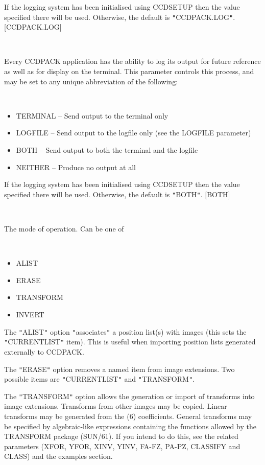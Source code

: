 \documentclass[twoside,11pt]{article}
\newcommand{\htmlref}[2]{#1}
\renewcommand{\_}{\texttt{\symbol{95}}}
\newcommand{\qt}[1]{{\tt "}#1{\tt "}}
\newcommand{\xroutine}[1]{\htmlref{{\sc #1}}{#1}}
\newcommand{\sstsubsection}[1]{ \item[{#1}] \mbox{} \\}
\newcommand{\sstitemlist}[1]{
  \mbox{} \\
  \vspace{-3.5ex}
  \begin{itemize}
     #1
  \end{itemize}
}
\newcommand{\sstitem}{\item}
\newcommand{\sstsubsection}[1]{\item[{#1}]}
\newcommand{\sstitemlist}[1]{
      \begin{itemize}
         #1
      \end{itemize}
      \\
   }
\newcommand{\sstitem}{\item}
\begin{document}
{{{         If the logging system has been initialised using \xroutine{CCDSETUP}
         then the value specified there will be used. Otherwise, the
         default is \qt{CCDPACK.LOG}.
         [CCDPACK.LOG]
      }
      \sstsubsection{
         LOGTO = LITERAL (Read)
      }{
         Every CCDPACK application has the ability to log its output
         for future reference as well as for display on the terminal.
         This parameter controls this process, and may be set to any
         unique abbreviation of the following:
         \sstitemlist{

            \sstitem
               TERMINAL  -- Send output to the terminal only

            \sstitem
               LOGFILE   -- Send output to the logfile only (see the
                               LOGFILE parameter)

            \sstitem
               BOTH      -- Send output to both the terminal and the
                               logfile

            \sstitem
               NEITHER   -- Produce no output at all

         }
         If the logging system has been initialised using \xroutine{CCDSETUP}
         then the value specified there will be used. Otherwise, the
         default is \qt{BOTH}.
         [BOTH]
      }
      \sstsubsection{
         MODE = LITERAL (Read)
      }{
         The mode of operation. Can be one of
         \sstitemlist{

            \sstitem
               ALIST

            \sstitem
               ERASE

            \sstitem
               TRANSFORM

            \sstitem
               INVERT

         }
         The \qt{ALIST} option \qt{associates} a position list(s) with images
         (this sets the \qt{CURRENT\_LIST} item).  This is useful when
         importing position lists generated externally to CCDPACK.

         The \qt{ERASE} option removes a named item from image extensions.
         Two possible items are \qt{CURRENT\_LIST} and \qt{TRANSFORM}.

         The \qt{TRANSFORM} option allows the generation or import of
         transforms into image extensions. Transforms from other images
         may be copied. Linear transforms may be generated from the (6)
         coefficients. General transforms may be specified by
         algebraic-like expressions containing the functions allowed by
         the TRANSFORM package (SUN/61). If you intend to do this, see
         the related parameters (XFOR, YFOR, XINV, YINV, FA-FZ, PA-PZ,
         CLASSIFY and CLASS) and the examples section.

}}}
\end{document}
